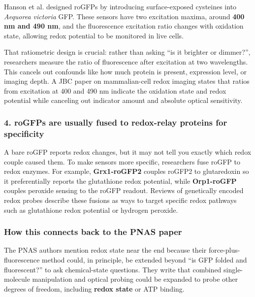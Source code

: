 \documentclass{article}
\begin{document}
Hanson et al. designed roGFPs by introducing surface-exposed cysteines into \textit{Aequorea victoria} GFP. These sensors have two excitation maxima, around \textbf{400 nm and 490 nm}, and the fluorescence excitation ratio changes with oxidation state, allowing redox potential to be monitored in live cells. \href{https://www.jbc.org/article/S0021-9258\%2819\%2964252-3/fulltext}{\textbullet}

That ratiometric design is crucial: rather than asking ``is it brighter or dimmer?'', researchers measure the ratio of fluorescence after excitation at two wavelengths. This cancels out confounds like how much protein is present, expression level, or imaging depth. A JBC paper on mammalian-cell redox imaging states that ratios from excitation at 400 and 490 nm indicate the oxidation state and redox potential while canceling out indicator amount and absolute optical sensitivity. \href{https://www.jbc.org/article/S0021-9258\%2820\%2966844-2/fulltext}{\textbullet}

\subsubsection*{4. roGFPs are usually fused to redox-relay proteins for specificity}

A bare roGFP reports redox changes, but it may not tell you exactly which redox couple caused them. To make sensors more specific, researchers fuse roGFP to redox enzymes. For example, \textbf{Grx1-roGFP2} couples roGFP2 to glutaredoxin so it preferentially reports the glutathione redox potential, while \textbf{Orp1-roGFP} couples peroxide sensing to the roGFP readout. Reviews of genetically encoded redox probes describe these fusions as ways to target specific redox pathways such as glutathione redox potential or hydrogen peroxide. \href{https://pmc.ncbi.nlm.nih.gov/articles/PMC3871076/}{\textbullet}

\subsubsection*{How this connects back to the PNAS paper}

The PNAS authors mention redox state near the end because their force-plus-fluorescence method could, in principle, be extended beyond ``is GFP folded and fluorescent?'' to ask chemical-state questions. They write that combined single-molecule manipulation and optical probing could be expanded to probe other degrees of freedom, including \textbf{redox state} or ATP binding. \href{https://www.pnas.org/doi/full/10.1073/pnas.1704937114}{\textbullet}
\end{document}

